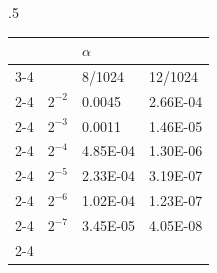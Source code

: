 \begin{table}[!htb]
	\centering
    \begin{subtable}{.5\linewidth}
      \centering
        \begin{tabular}{llll}
                                &                               & $\alpha$                                              &                                                       \\ \cline{3-4} 
                                & \multicolumn{1}{l|}{}         & \multicolumn{1}{l|}{8/1024}                           & \multicolumn{1}{l|}{12/1024}                          \\ \cline{2-4} 
\multicolumn{1}{l|}{}           & \multicolumn{1}{l|}{$2^{-2}$} & \multicolumn{1}{l|}{\cellcolor[HTML]{C0C0C0}0.0045}   & \multicolumn{1}{l|}{\cellcolor[HTML]{C0C0C0}2.66E-04} \\ \cline{2-4} 
\multicolumn{1}{l|}{}           & \multicolumn{1}{l|}{$2^{-3}$} & \multicolumn{1}{l|}{0.0011}                           & \multicolumn{1}{l|}{1.46E-05}                         \\ \cline{2-4} 
\multicolumn{1}{l|}{}           & \multicolumn{1}{l|}{$2^{-4}$} & \multicolumn{1}{l|}{\cellcolor[HTML]{C0C0C0}4.85E-04} & \multicolumn{1}{l|}{\cellcolor[HTML]{C0C0C0}1.30E-06} \\ \cline{2-4} 
\multicolumn{1}{l|}{$\Delta t$} & \multicolumn{1}{l|}{$2^{-5}$} & \multicolumn{1}{l|}{2.33E-04}                         & \multicolumn{1}{l|}{3.19E-07}                         \\ \cline{2-4} 
\multicolumn{1}{l|}{}           & \multicolumn{1}{l|}{$2^{-6}$} & \multicolumn{1}{l|}{\cellcolor[HTML]{C0C0C0}1.02E-04} & \multicolumn{1}{l|}{\cellcolor[HTML]{C0C0C0}1.23E-07} \\ \cline{2-4} 
\multicolumn{1}{l|}{}           & \multicolumn{1}{l|}{$2^{-7}$} & \multicolumn{1}{l|}{3.45E-05}                         & \multicolumn{1}{l|}{4.05E-08}                         \\ \cline{2-4} 
\end{tabular}


\end{subtable}
\end{table}
